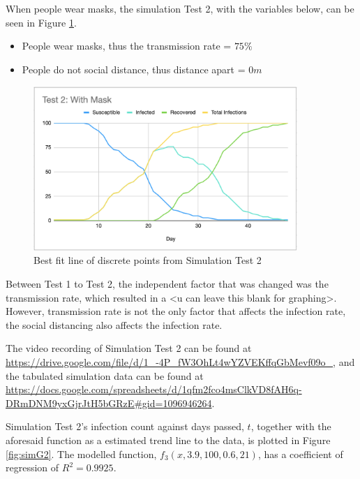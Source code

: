 \documentclass[a4paper,titlepage]{article}
\begin{document}
When people wear masks, the simulation Test 2, with the variables below, can be seen in Figure \ref{fig:simT2}.

\begin{itemize}
    \item People wear masks, thus the transmission rate = $75\%$
    \item People do not social distance, thus distance apart = $0\si{m}$
\end{itemize}

\begin{figure}[htbp]
    \centering
    \includegraphics[width=10cm]{simT2.png}
    \caption{Best fit line of discrete points from Simulation Test 2}
    \label{fig:simT2}
\end{figure}

Between Test 1 to Test 2, the independent factor that was changed was the transmission rate, which resulted in a <u can leave this blank for graphing>. However, transmission rate is not the only factor that affects the infection rate, the social distancing also affects the infection rate.

The video recording of Simulation Test 2 can be found at \url{https://drive.google.com/file/d/1_-4P_fW3OhLt4wYZVEKffqGbMevf09o_}, and the tabulated simulation data can be found at \url{https://docs.google.com/spreadsheets/d/1qfm2fco4msClkVD8fAH6q-DRmDNM9yxGjrJtH5bGRzE#gid=1096946264}.

Simulation Test 2's infection count against days passed, $t$, together with the aforesaid function as a estimated trend line to the data, is plotted in Figure \ref{fig:simG2}. The modelled function, $f_3(x,3.9,100,0.6,21)$, has a coefficient of regression of $R^2=0.9925$.
\end{document}
